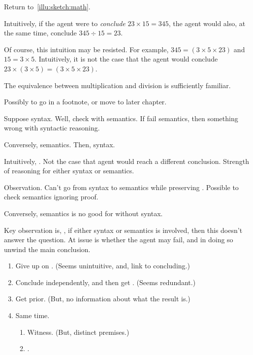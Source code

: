 \begin{note}
  Return to~\autoref{illu:sketch:math}.

  \begin{quote}
    \scenarioClacMulDiv*
  \end{quote}

  Intuitively, if the agent were to \emph{conclude} \(23 \times 15 = 345\), the agent would also, at the same time, conclude \(345 \div 15 = 23\).

  Of course, this intuition may be resisted.
  For example, \(345 = (3 \times 5 \times 23)\) and \(15 = 3 \times 5\).
  Intuitively, it is not the case that the agent would conclude \(23 \times (3 \times 5) = (3 \times 5 \times 23)\).

  The equivalence between multiplication and division is sufficiently familiar.
\end{note}

\begin{note}
  {
    \color{red}
    Possibly to go in a footnote, or move to later chapter.
  }

  Suppose syntax.
  Well, check with semantics.
  If fail semantics, then something wrong with syntactic reasoning.

  Conversely, semantics.
  Then, syntax.

  Intuitively, .
  Not the case that agent would reach a different conclusion.
  Strength of reasoning for either syntax or semantics.

  Observation.
  Can't go from syntax to semantics while preserving \zS{}.
  Possible to check semantics ignoring proof.

  Conversely, semantics is no good for \zS{} without syntax.

  Key observation is, \zS{}, if either syntax or semantics is involved, then this doesn't answer the question.
  At issue is whether the agent may fail, and in doing so unwind the main conclusion.
\end{note}

\begin{note}[Options]
  \begin{enumerate}
  \item
    Give up on \zS{}.
    {
      \color{red}
      (Seems unintuitive, and, link to concluding.)
    }
  \item
    Conclude independently, and then get \zS{}.
    {
      \color{red}
      (Seems redundant.)
    }
  \item
    Get  prior.
    {
      \color{red}
      (But, no information about what the result is.)
    }
  \item
    Same time.
    \begin{enumerate}
    \item
      Witness.
      {
        \color{red}
        (But, distinct premises.)
      }
    \item
      .
    \end{enumerate}
  \end{enumerate}
\end{note}


